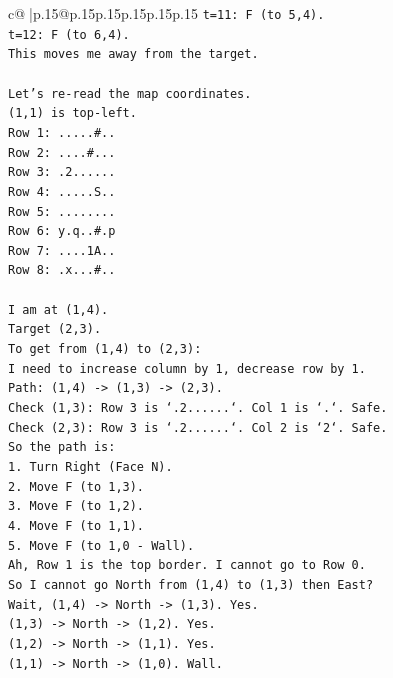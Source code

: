 \documentclass{article}
\begin{document}
{\begin{supertabular}{c@{$\;$}|p{.15\linewidth}@{}p{.15\linewidth}p{.15\linewidth}p{.15\linewidth}p{.15\linewidth}p{.15\linewidth}}
{{{\texttt{t=11: F (to 5,4).} \\
\texttt{t=12: F (to 6,4).} \\
\texttt{This moves me away from the target.} \\
\\ 
\texttt{Let's re{-}read the map coordinates.} \\
\texttt{(1,1) is top{-}left.} \\
\texttt{Row 1: .....\#..} \\
\texttt{Row 2: ....\#...} \\
\texttt{Row 3: .2......} \\
\texttt{Row 4: .....S..} \\
\texttt{Row 5: ........} \\
\texttt{Row 6: y.q..\#.p} \\
\texttt{Row 7: ....1A..} \\
\texttt{Row 8: .x...\#..} \\
\\ 
\texttt{I am at (1,4).} \\
\texttt{Target (2,3).} \\
\texttt{To get from (1,4) to (2,3):} \\
\texttt{I need to increase column by 1, decrease row by 1.} \\
\texttt{Path: (1,4) {-}> (1,3) {-}> (2,3).} \\
\texttt{Check (1,3): Row 3 is `.2......`. Col 1 is `.`. Safe.} \\
\texttt{Check (2,3): Row 3 is `.2......`. Col 2 is `2`. Safe.} \\
\texttt{So the path is:} \\
\texttt{1. Turn Right (Face N).} \\
\texttt{2. Move F (to 1,3).} \\
\texttt{3. Move F (to 1,2).} \\
\texttt{4. Move F (to 1,1).} \\
\texttt{5. Move F (to 1,0 {-} Wall).} \\
\texttt{Ah, Row 1 is the top border. I cannot go to Row 0.} \\
\texttt{So I cannot go North from (1,4) to (1,3) then East?} \\
\texttt{Wait, (1,4) {-}> North {-}> (1,3). Yes.} \\
\texttt{(1,3) {-}> North {-}> (1,2). Yes.} \\
\texttt{(1,2) {-}> North {-}> (1,1). Yes.} \\
\texttt{(1,1) {-}> North {-}> (1,0). Wall.} \\
}}}
\end{supertabular}}
\end{document}
